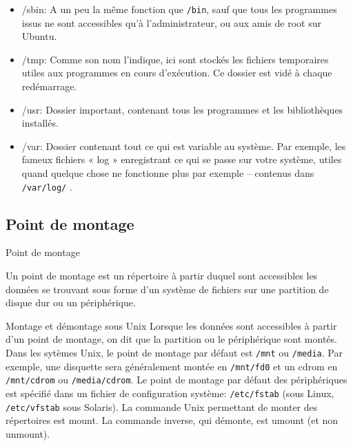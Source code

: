 \documentclass[10pt]{beamer}
\begin{document}
\begin{frame}
\begin{itemize}
\item \alert{/sbin}: A un peu la même fonction que \texttt{/bin}, sauf que tous les programmes
issus ne sont accessibles qu'à l'administrateur, ou aux amis de root sur
Ubuntu.
\item \alert{/tmp}: Comme son nom l'indique, ici sont stockés les fichiers temporaires
utiles aux programmes en cours d'exécution. Ce dossier est vidé à chaque
redémarrage.
\item \alert{/usr}: Dossier important, contenant tous les programmes et les bibliothèques installés.
\item \alert{/var}: Dossier contenant tout ce qui est variable au système. Par exemple,
les fameux fichiers « log » enregistrant ce qui se passe sur votre système,
utiles quand quelque chose ne fonctionne plus par exemple – contenus
dans \texttt{/var/log/} .
\end{itemize}
\end{frame}
\subsection{Point de montage}
\begin{frame}{Point de montage}

	Un point de montage est un répertoire à partir duquel sont accessibles les données se trouvant sous forme d'un système de fichiers sur une partition de disque dur ou un périphérique. 

\begin{alertblock}{Montage et démontage sous Unix}
Lorsque les données sont accessibles à partir d'un point de montage, on dit que la
partition ou le périphérique  sont montés. Dans les sytèmes Unix, le point de
montage par défaut est \texttt{/mnt} ou \texttt{/media}. Par exemple, une disquette sera généralement montée en \texttt{/mnt/fd0} et un cdrom en \texttt{/mnt/cdrom} ou \texttt{/media/cdrom}.
Le point de montage par défaut des périphériques est spécifié dans un fichier de
configuration système: \texttt{/etc/fstab} (sous Linux, \texttt{/etc/vfstab}   sous   Solaris).   La commande Unix permettant de monter des répertoires est \alert{mount}. La commande
inverse, qui démonte, est \alert{umount} (et non unmount).
\end{alertblock}
\end{frame}
\end{document}
